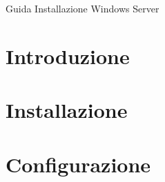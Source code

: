 \documentclass[a4paper]{article}
\begin{document}
{\LARGE Guida Installazione Windows Server}

\pagebreak{}
\thispagestyle{header-pages}
\tableofcontents

\pagebreak{}
\thispagestyle{header-pages}

\section{Introduzione}

\pagebreak{}


\section{Installazione}

\pagebreak{}

\thispagestyle{header-pages}
\section{Configurazione}

\end{document}

